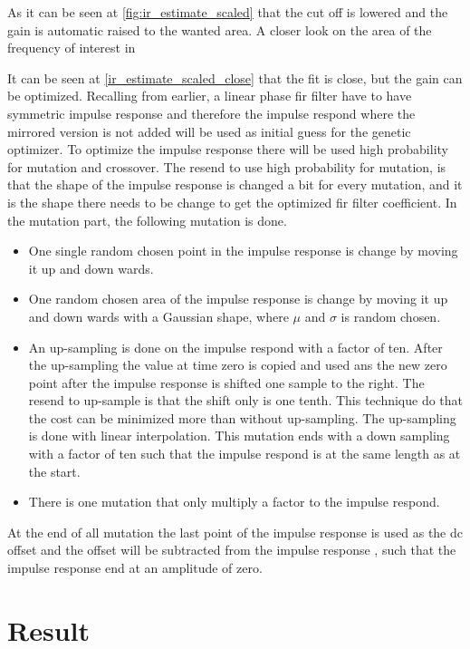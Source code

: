 As it can be seen at \autoref{fig:ir_estimate_scaled} that the cut off is lowered and the gain is automatic raised to the wanted area. A closer look on the area of the frequency of interest in 

It can be seen at \autoref{ir_estimate_scaled_close} that the fit is close, but the gain can be optimized. Recalling from earlier, a linear phase \gls{fir} filter have to have symmetric impulse response and therefore the impulse respond where the mirrored version is not added will be used as initial guess for the genetic optimizer. To optimize the impulse response there will be used high probability for mutation and crossover. The resend to use high probability for mutation, is that the shape of the impulse response is changed a bit for every mutation, and it is the shape there needs to be change to get the optimized \gls{fir} filter coefficient. In the mutation part, the following mutation is done.

\begin{itemize}
\item One single random chosen point in the impulse response is change by moving it up and down wards.
\item One random chosen area of the impulse response is change by moving it up and down wards with a Gaussian shape, where $\mu$ and $\sigma$ is random chosen.
\item An up-sampling is done on the impulse respond with a factor of ten. After the up-sampling the value at time zero is copied and used ans the new zero point after the impulse response is shifted one sample to the right. The resend to up-sample is that the shift only is one tenth. This technique do that the cost can be minimized more than without up-sampling. The up-sampling is done with linear interpolation. This mutation ends with a down sampling with a factor of ten such that the impulse respond is at the same length as at the start.
\item There is one mutation that only multiply a factor to the impulse respond. 
\end{itemize}

At the end of all mutation the last point of the impulse response is used as the \gls{dc} offset and the offset will be subtracted from the impulse response , such that the impulse response end at an amplitude of zero. 

\section{Result}


